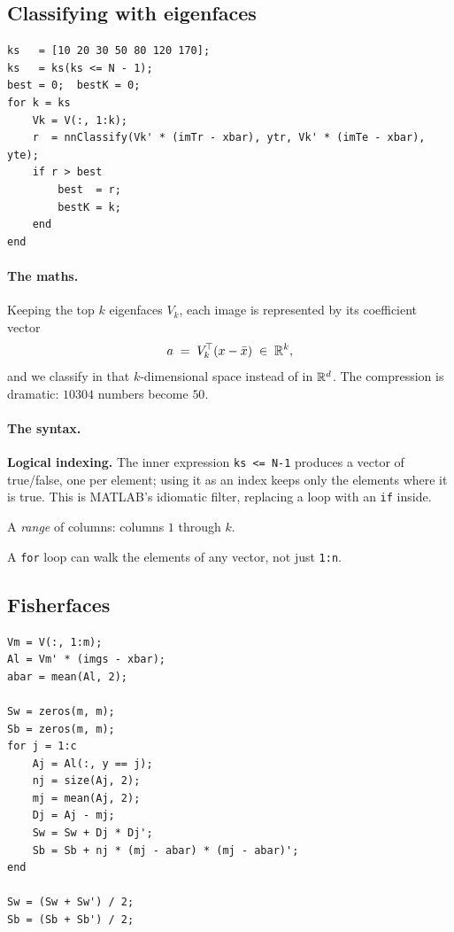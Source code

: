 \subsection{Classifying with eigenfaces}

\begin{lstlisting}
ks   = [10 20 30 50 80 120 170];
ks   = ks(ks <= N - 1);
best = 0;  bestK = 0;
for k = ks
    Vk = V(:, 1:k);
    r  = nnClassify(Vk' * (imTr - xbar), ytr, Vk' * (imTe - xbar), yte);
    if r > best
        best  = r;
        bestK = k;
    end
end
\end{lstlisting}

\paragraph{The maths.} Keeping the top $k$ eigenfaces $V_k$, each image is
represented by its coefficient vector
\[
  a \;=\; V_k^{\!\top}(x - \bar{x}) \;\in\; \mathbb{R}^{k},
\]
and we classify in that $k$-dimensional space instead of in $\mathbb{R}^d$. The
compression is dramatic: $10304$ numbers become $50$.

\paragraph{The syntax.}
\begin{description}[leftmargin=*,style=nextline,nosep]
\item[\texttt{ks(ks <= N-1)}] \textbf{Logical indexing.} The inner expression
  \texttt{ks <= N-1} produces a vector of true/false, one per element; using it
  as an index keeps only the elements where it is true. This is MATLAB's
  idiomatic filter, replacing a loop with an \texttt{if} inside.
\item[\texttt{V(:, 1:k)}] A \emph{range} of columns: columns $1$ through $k$.
\item[\texttt{for k = ks}] A \texttt{for} loop can walk the elements of any
  vector, not just \texttt{1:n}.
\end{description}

\subsection{Fisherfaces}
\label{sec:fisherfn}

\begin{lstlisting}
Vm = V(:, 1:m);
Al = Vm' * (imgs - xbar);
abar = mean(Al, 2);

Sw = zeros(m, m);
Sb = zeros(m, m);
for j = 1:c
    Aj = Al(:, y == j);
    nj = size(Aj, 2);
    mj = mean(Aj, 2);
    Dj = Aj - mj;
    Sw = Sw + Dj * Dj';
    Sb = Sb + nj * (mj - abar) * (mj - abar)';
end

Sw = (Sw + Sw') / 2;
Sb = (Sb + Sb') / 2;
\end{lstlisting}

